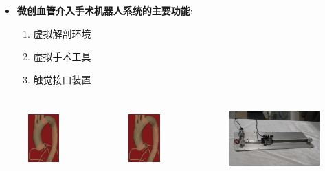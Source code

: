 \begin{frame}
\begin{itemize}
  \item \textbf{微创血管介入手术机器人系统的主要功能}: 
  \begin{enumerate}
     \item 虚拟解剖环境
     \item 虚拟手术工具
     \item 触觉接口装置
  \end{enumerate}
\end{itemize}
\begin{columns}[b,onlytextwidth]
\begin{column}{.25\textwidth}
 \begin{figure}[t]
\centering
\includegraphics[height=1.0in]{../../Figures/background/simulation2.eps}
\end{figure}
\end{column}
\begin{column}{.25\textwidth}
 \begin{figure}[t]
\centering
\includegraphics[height=1.0in]{../../Figures/background/simulation.eps}
\end{figure}
\end{column}
\begin{column}{.5\textwidth}
 \begin{figure}[t]
\centering
\includegraphics[height=1.0in]{../../Figures/background/interface.eps}
\end{figure}
\end{column}
\end{columns}
\end{frame}

